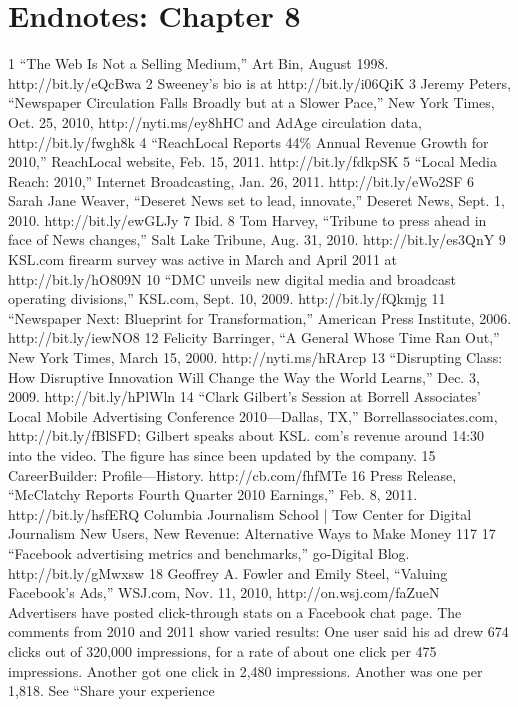 \section{Endnotes: Chapter 8}
1 ``The Web Is Not a Selling Medium,'' Art Bin, August 1998. http://bit.ly/eQcBwa
2 Sweeney’s bio is at http://bit.ly/i06QiK
3 Jeremy Peters, ``Newspaper Circulation Falls Broadly but at a Slower Pace,'' New York Times,
Oct. 25, 2010, http://nyti.ms/ey8hHC and AdAge circulation data, http://bit.ly/fwgh8k
4 ``ReachLocal Reports 44\% Annual Revenue Growth for 2010,'' ReachLocal website,
Feb. 15, 2011. http://bit.ly/fdkpSK
5 ``Local Media Reach: 2010,'' Internet Broadcasting, Jan. 26, 2011. http://bit.ly/eWo2SF
6 Sarah Jane Weaver, ``Deseret News set to lead, innovate,'' Deseret News, Sept. 1, 2010.
http://bit.ly/ewGLJy
7 Ibid.
8 Tom Harvey, ``Tribune to press ahead in face of News changes,'' Salt Lake Tribune,
Aug. 31, 2010. http://bit.ly/es3QnY
9 KSL.com firearm survey was active in March and April 2011 at http://bit.ly/hO809N
10 ``DMC unveils new digital media and broadcast operating divisions,'' KSL.com, Sept. 10, 2009.
http://bit.ly/fQkmjg
11 ``Newspaper Next: Blueprint for Transformation,'' American Press Institute, 2006.
http://bit.ly/iewNO8
12 Felicity Barringer, ``A General Whose Time Ran Out,'' New York Times, March 15, 2000.
http://nyti.ms/hRArcp
13 ``Disrupting Class: How Disruptive Innovation Will Change the Way the World Learns,''
Dec. 3, 2009. http://bit.ly/hPlWln
14 ``Clark Gilbert’s Session at Borrell Associates’ Local Mobile Advertising Conference
2010—Dallas, TX,'' Borrellassociates.com, http://bit.ly/fBlSFD; Gilbert speaks about KSL.
com’s revenue around 14:30 into the video. The figure has since been updated by the company.
15 CareerBuilder: Profile—History. http://cb.com/fhfMTe
16 Press Release, ``McClatchy Reports Fourth Quarter 2010 Earnings,'' Feb. 8, 2011.
http://bit.ly/hsfERQ
Columbia Journalism School | Tow Center for Digital Journalism
New Users, New Revenue: Alternative Ways to Make Money 117
17 ``Facebook advertising metrics and benchmarks,'' go-Digital Blog. http://bit.ly/gMwxsw
18 Geoffrey A. Fowler and Emily Steel, ``Valuing Facebook’s Ads,'' WSJ.com, Nov. 11, 2010,
http://on.wsj.com/faZueN Advertisers have posted click-through stats on a Facebook chat
page. The comments from 2010 and 2011 show varied results: One user said his ad drew 674
clicks out of 320,000 impressions, for a rate of about one click per 475 impressions. Another
got one click in 2,480 impressions. Another was one per 1,818. See ``Share your experience

